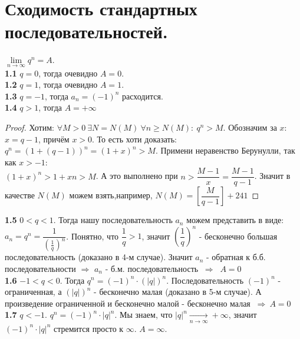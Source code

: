 \documentclass[12pt]{article}
\begin{document}
\section{Сходимость стандартных последовательностей.
}

 $\lim\limits_{n \to \infty} q^n = A$. \\
\textbf{1.1} $q = 0$, тогда очевидно $A = 0$. \\
\textbf{1.2} $q = 1$, тогда очевидно $A = 1$. \\
\textbf{1.3} $q = -1$, тогда $a_n = (-1)^n$ расходится. \\
\textbf{1.4} $q > 1$, тогда $A = +\infty$
    \begin{proof}
        Хотим: $\forall M>0 \ \exists N = N(M) \ \forall n \geq N(M) : \ q^n > M$. Обозначим за $x$: $x = q-1$, причём $x > 0$. То есть хоти доказать: \\
        $q^n = (1 + (q-1))^n = (1 + x)^n > M$. Примени неравенство Берунулли, так как $x > -1$: \\
        $(1 + x)^n > 1 + xn > M$. А это выполнено при $n > \dfrac{M-1}{x} = \dfrac{M-1}{q-1}$. Значит в качестве $N(M)$ можем взять,например, $N(M) = \left[\dfrac{M}{q-1}\right] + 241$
    \end{proof}
\noindent \textbf{1.5} $0 < q < 1$. Тогда нашу последовательность $a_n$ можем представить в виде: $a_n = q^n = \dfrac{1}{\left(\frac{1}{q}\right)^n}$. Понятно, что $\dfrac1q > 1$, значит $\left(\dfrac1q\right)^n$ - бесконечно большая последовательность (доказано в 4-м случае). Значит $a_n$ - обратная к б.б. последовательности $\Rightarrow$ $a_n$ - б.м. последовательность $\ \Rightarrow \ $ $A = 0$ \\
\textbf{1.6} $-1 < q < 0$. Тогда $q^n = (-1)^n \cdot (|q|)^n$. Последовательность $(-1)^n$ - ограниченная, а $(|q|)^n$ - бесконечно малая (доказано в 5-м случае). А произведение ограниченной и бесконечно малой - бесконечно малая $ \ \Rightarrow \ A = 0 $ \\
\textbf{1.7} $q < -1$. $q^n = (-1)^n \cdot |q|^n$. Мы знаем, что $|q|^n \xrightarrow[n \to \infty]{} +\infty$, значит  $ (-1)^n \cdot |q|^n$ стремится просто к $\infty$. $A = \infty$.
\end{document}
